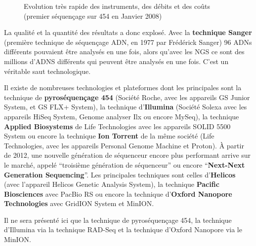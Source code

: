 \documentclass[a4paper,11pt,twoside]{report}
\begin{document}
\begin{figure}[!ht]
\caption{Evolution très rapide des instruments, des débits et des coûts (premier séquençage sur 454 en Janvier 2008)\label{moore}}
\end{figure}

La qualité et la quantité des résultats a donc explosé. Avec la \textbf{technique Sanger} (première technique de séquençage ADN, en 1977 par Frédérick Sanger) 96 ADNs différents pouvaient être analysés en une fois, alors qu'avec les NGS ce sont des millions d'ADNS différents qui peuvent être analysés en une fois. C'est un véritable saut technologique.

Il existe de nombreuses technologies et plateformes dont les principales sont la technique de \textbf{pyroséquençage 454} (Société Roche, avec les appareils GS Junior System, et GS FLX+ System), la technique d'\textbf{Illumina} (Société Solexa avec les appareils HiSeq System, Genome analyser Ilx ou encore MySeq), la technique  \textbf{Applied Biosystems} de Life Technologies avec les appareils SOLID 5500 System ou encore la technique \textbf{Ion Torrent} de la même société (Life Technologies, avec les appareils Personal Genome Machine et Proton). À partir de 2012, une nouvelle génération de séquenceur encore plus performant arrive sur le marché, appelé ``troisième génération de séquenceur'' ou encore ``\textbf{Next-Next Generation Sequencing}''. Les principales techniques sont celles d'\textbf{Helicos} (avec l'appareil Helicos Genetic Analysis System), la technique \textbf{Pacific Biosciences} avec PacBio RS ou encore la technique d'\textbf{Oxford Nanopore Technologies} avec GridION System et MinION. 

Il ne sera présenté ici que la technique de pyroséquençage 454, la technique d'Illumina via la technique RAD-Seq et la technique d'Oxford Nanopore via le MinION.
\end{document}
